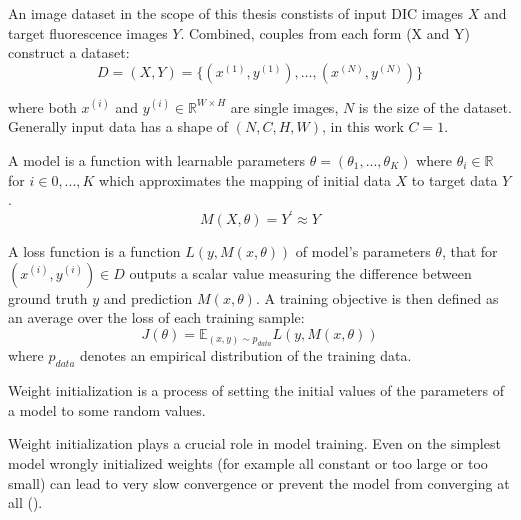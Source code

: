 \begin{definition}
	An image dataset in the scope of this thesis constists of input DIC images $X$ and target fluorescence images $Y$. Combined, couples from each form (X and Y) construct a dataset:
	\begin{equation}
		D = (X, Y) = \{(x^{(1)}, y^{(1)}), \dots, (x^{(N)}, y^{(N)})\}
	\end{equation}

	where both $x^{(i)}$ and $y^{(i)} \in \mathbb{R}^{W \times H}$ are single images, $N$ is the size of the dataset. Generally input data has a shape of $(N, C, H, W)$, in this work $C = 1$.
\end{definition}

\begin{definition}[Model]
	A model is a function with learnable parameters $\theta = (\theta_1, ..., \theta_K)$ where $\theta_i \in \mathbb{R}$ for $i \in {0, ..., K}$ which approximates the mapping of initial data $X$ to target data $Y$.
	\begin{equation}
		M(X,\theta) = Y^\prime \approx Y 
	\end{equation}
\end{definition}

\begin{definition}
	A loss function is a function $L(y, M(x, \theta))$ of model's parameters $\theta$, that for $(x^{(i)}, y^{(i)}) \in D$ outputs a scalar value measuring the difference between ground truth $y$ and prediction $M(x, \theta)$. A training objective is then defined as an average over the loss of each training sample:
	\begin{equation}
		J(\theta) = \mathbb{E}_{(x, y)\sim p_{data}} L(y, M(x, \theta))
	\end{equation}
	where $p_{data}$ denotes an empirical distribution of the training data.
\end{definition}

\begin{definition}
	Weight initialization is a process of setting the initial values of the parameters of a model to some random values.
\end{definition}

Weight initialization plays a crucial role in model training. Even on the simplest model wrongly initialized weights (for example all constant or too large or too small) can lead to very slow convergence or prevent the model from converging at all (\cite{Kumar_2017}).

